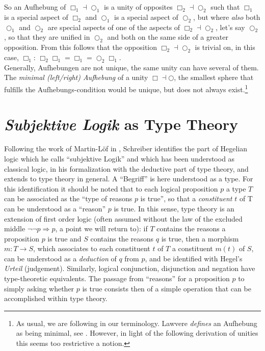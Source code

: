 \documentclass{article}
\begin{document}
So an Aufhebung of $\Box_1\dashv\bigcirc_1$ is a unity of opposites $\Box_2\dashv\bigcirc_2$ such that
$\Box_1$ is a special aspect of $\Box_2$ and $\bigcirc_1$ is a special aspect of $\bigcirc_2$, but where
\emph{also} both $\bigcirc_1$ and $\bigcirc_2$ are special aspects of one of the aspects of $\Box_2\dashv\bigcirc_2$,
let's say $\bigcirc_2$, so that they are unified in $\bigcirc_2$ and both on the same side of a greater
opposition. From this follows that the opposition $\Box_2\dashv\bigcirc_2$ is trivial on, in this case,
$\Box_1$: $\Box_2\Box_1=\Box_1=\bigcirc_2\Box_1$. \\

Generally, Aufhebungen are not unique, the same unity can have several of them. The \emph{minimal (left/right)
Aufhebung} of a unity $\Box\dashv\bigcirc$, the smallest sphere that fulfills the Aufhebungs-condition
would be unique, but does not always exist.\footnote{As usual, we are following \cite{nlabsol} in our terminology.
Lawvere \emph{defines} an Aufhebung as being minimal, see \cite{Lawvere92}. However, in light of the following
derivation of unities this seems too restrictive a notion.}


\section{\emph{Subjektive Logik} as Type Theory}
Following the work of Martin-Löf in \cite{Loef96}, Schreiber identifies the part of Hegelian logic which
he calls ``subjektive Logik'' and which has been understood as classical logic, in his formalization with
the deductive part of type theory, and extends to type theory in general. A ``Begriff'' is here understood
as a type. For this identification it should be noted that to each logical proposition $p$ a type $T$
can be associated as the ``type of reasons $p$ is true'', so that a \emph{constituent} $t$ of T can be
understood as a ``reason'' $p$ is true. In this sense, type theory is an extension of first order logic
(often assumed without the law of the excluded middle $\neg\neg p \Rightarrow p$, a point we will return
to): if $T$ contains the reasons a proposition $p$ is true and $S$ contains the reasons $q$ is true, then
a morphism $m:T\rightarrow S$, which associates to each constituent $t$ of $T$ a constituent $m(t)$ of
$S$, can be understood as a \emph{deduction} of $q$ from $p$, and be identified with Hegel's \emph{Urteil}
(judgement). Similarly, logical conjunction, disjunction and negation have type-theoretic equivalents.
The passage from ``reasons'' for a proposition $p$ to simply asking whether $p$ is true consists then
of a simple operation that can be accomplished within type theory. \\
\end{document}
